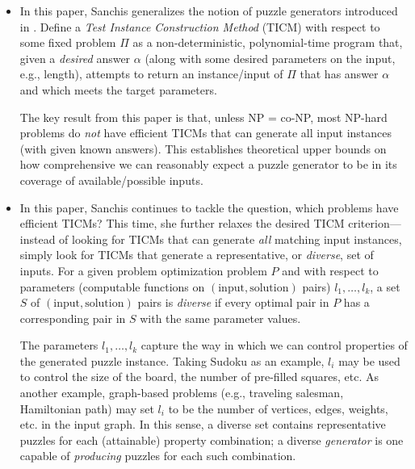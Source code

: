 \documentclass{extarticle}
\begin{document}
\begin{itemize}
  \item {}

    \begin{annotation}
      In this paper, Sanchis generalizes the notion of puzzle generators
      introduced in \textcite{language-instances}.  Define a \emph{Test
      Instance Construction Method} (TICM) with respect to some fixed problem
      \(\Pi\) as a non-deterministic, polynomial-time program that, given a
      \emph{desired} answer \(\alpha\) (along with some desired parameters on
      the input, e.g., length), attempts to return an instance/input of \(\Pi\)
      that has answer \(\alpha\) and which meets the target parameters.

      The key result from this paper is that, unless NP = co-NP, most NP-hard
      problems do \emph{not} have efficient TICMs that can generate all input
      instances (with given known answers).  This establishes theoretical upper
      bounds on how comprehensive we can reasonably expect a puzzle generator
      to be in its coverage of available/possible inputs.
    \end{annotation}

  \item {}

    \begin{annotation}
      In this paper, Sanchis continues to tackle the question, which problems
      have efficient TICMs?  This time, she further relaxes the desired TICM
      criterion---instead of looking for TICMs that can generate \emph{all}
      matching input instances, simply look for TICMs that generate a
      representative, or \emph{diverse}, set of inputs.  For a given problem
      optimization problem \(P\) and with respect to parameters (computable
      functions on \((\text{input}, \text{solution})\) pairs) \(l_1, \dots,
      l_k\), a set \(S\) of \((\text{input}, \text{solution})\) pairs is
      \emph{diverse} if every optimal pair in \(P\) has a corresponding pair in
      \(S\) with the same parameter values.

      The parameters \(l_1, \dotsc, l_k\) capture the way in which we can
      control properties of the generated puzzle instance.  Taking Sudoku as an
      example, \(l_i\) may be used to control the size of the board, the number
      of pre-filled squares, etc.  As another example, graph-based problems
      (e.g., traveling salesman, Hamiltonian path) may set \(l_i\) to be the
      number of vertices, edges, weights, etc. in the input graph.  In this
      sense, a diverse set contains representative puzzles for each
      (attainable) property combination; a diverse \emph{generator} is one
      capable of \emph{producing} puzzles for each such combination.


\end{annotation}
\end{itemize}
\end{document}
